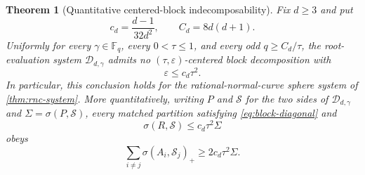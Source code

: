 \documentclass[11pt,letterpaper]{amsart}
\newtheorem{theorem}{Theorem}[section]
\theoremstyle{definition}
\theoremstyle{remark}
\newcommand{\1}{\mathbf 1}
\begin{document}
\begin{theorem}[Quantitative centered-block indecomposability]\label{thm:rnc-block-indecomp}
Fix $d\ge3$ and put
\[
 c_d=\frac{d-1}{32d^2},
 \qquad
 C_d=8d(d+1).
\]
Uniformly for every $\gamma\in\mathbb F_q$, every $0<\tau\le1$, and every odd $q\ge C_d/\tau$, the root-evaluation system $\mathcal D_{d,\gamma}$ admits no $(\tau,\varepsilon)$-centered block decomposition with
\[
 \varepsilon\le c_d\tau^2.
\]
In particular, this conclusion holds for the rational-normal-curve sphere system of \cref{thm:rnc-system}.  More quantitatively, writing $P$ and $\mathcal S$ for the two sides of $\mathcal D_{d,\gamma}$ and $\Sigma=\sigma(P,\mathcal S)$, every matched partition satisfying \eqref{eq:block-diagonal} and
\[
 \sigma(R,\mathcal S)\le c_d\tau^2\Sigma
\]
obeys
\begin{equation}\label{eq:rnc-cross-lower}
 \sum_{i\ne j}\sigma(A_i,\mathcal S_j)_+
 \ge2c_d\tau^2\Sigma.
\end{equation}
\end{theorem}
\end{document}
